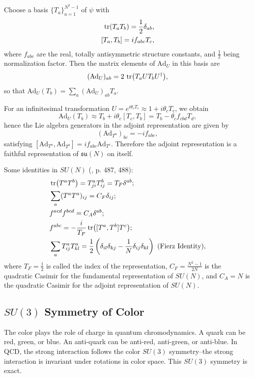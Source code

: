 \documentclass[12pt]{article}
\begin{document}
	Choose a basis $\{T_a\}_{a=1}^{N^2-1}$ of $\psi$ with
	\begin{align}
		\tr(T_aT_b)=\frac12\delta_{ab}, \\ [T_a,T_b]=i f_{abc}T_c,
	\end{align}
	where $f_{abc}$ are the real, totally antisymmetric structure constants, and $\frac{1}{2}$ being normalization factor. Then the matrix elements of $\text{Ad}_U$ in this basis are
	\begin{equation}
		(\text{Ad}_U)_{ab}=2\,\tr(T_a U T_b U^\dagger),
	\end{equation}
	so that $\text{Ad}_U(T_b)=\sum_a (\text{Ad}_U)_{ab}T_a$. 
	
	For an infinitesimal transformation $U=e^{i\theta_c T_c}\approx 1+i\theta_c T_c$, we obtain
	\[
	\text{Ad}_U(T_b)\approx T_b + i\theta_c[T_c,T_b]=T_b-\theta_c f_{cbd}T_d,
	\]
	hence the Lie algebra generators in the adjoint representation are given by
	\[
	(\text{Ad}_{T^a})_{bc}=-i f_{abc},
	\]
	satisfying $[\text{Ad}_{T^a},\text{Ad}_{T^b}]=i f_{abc}\text{Ad}_{T^c}$. Therefore the adjoint representation is a faithful representation of $\mathfrak{su}(N)$ on itself.
	
	Some identities in $SU(N)$ (\cite{schwartz1}, p. 487, 488):
	\begin{align}
		&\tr(T^aT^b) = T^a_{ji}T^b_{ij} = T_F\delta^{ab}; \nonumber\\
		&\sum_a(T^aT^a)_{ij} = C_F\delta_{ij};\nonumber\\
		&f^{acd}f^{bcd} = C_A\delta^{ab};\nonumber\\
		&f^{abc} = -\frac{i}{T_F}\tr([T^a, T^b]T^c);\nonumber \\
		&\sum_aT^a_{ij}T^a_{kl} = \frac{1}{2}\left( \delta_{il}\delta_{kj}-\frac{1}{N}\delta_{ij}\delta_{kl}\right) \text{ (Fierz Identity)},\label{fabc formula & Fierz Identity}
	\end{align}
	where $T_F = \frac{1}{2}$ is called the index of the representation, $C_F = \frac{N^2-1}{2N}$ is the quadratic Casimir for the fundamental representation of $SU(N)$, and $C_A = N$ is the quadratic Casimir for the adjoint representation of $SU(N)$. 
	
	
	
	
	\subsection{$SU(3)$ Symmetry of Color}
	The color plays the role of charge in quantum chromodynamics. A quark can be red, green, or blue. An anti-quark can be anti-red, anti-green, or anti-blue. In QCD, the strong interaction follows the color $SU(3)$ symmetry--the strong interaction is invariant under rotations in color space. This $SU(3)$ symmetry is exact.
	
\end{document}
